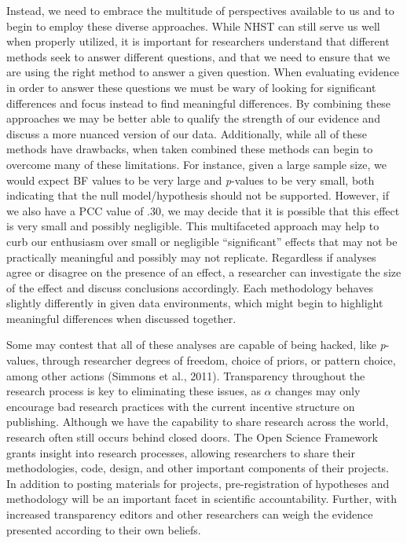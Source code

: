 \documentclass[english,man]{apa6}
\theoremstyle{definition}
\theoremstyle{definition}
\theoremstyle{definition}
\theoremstyle{remark}
\begin{document}
Instead, we need to embrace the multitude of perspectives available to
us and to begin to employ these diverse approaches. While NHST can still
serve us well when properly utilized, it is important for researchers
understand that different methods seek to answer different questions,
and that we need to ensure that we are using the right method to answer
a given question. When evaluating evidence in order to answer these
questions we must be wary of looking for significant differences and
focus instead to find meaningful differences. By combining these
approaches we may be better able to qualify the strength of our evidence
and discuss a more nuanced version of our data. Additionally, while all
of these methods have drawbacks, when taken combined these methods can
begin to overcome many of these limitations. For instance, given a large
sample size, we would expect BF values to be very large and
\emph{p}-values to be very small, both indicating that the null
model/hypothesis should not be supported. However, if we also have a PCC
value of .30, we may decide that it is possible that this effect is very
small and possibly negligible. This multifaceted approach may help to
curb our enthusiasm over small or negligible \enquote{significant}
effects that may not be practically meaningful and possibly may not
replicate. Regardless if analyses agree or disagree on the presence of
an effect, a researcher can investigate the size of the effect and
discuss conclusions accordingly. Each methodology behaves slightly
differently in given data environments, which might begin to highlight
meaningful differences when discussed together.

Some may contest that all of these analyses are capable of being hacked,
like \emph{p}-values, through researcher degrees of freedom, choice of
priors, or pattern choice, among other actions (Simmons et al., 2011).
Transparency throughout the research process is key to eliminating these
issues, as \(\alpha\) changes may only encourage bad research practices
with the current incentive structure on publishing. Although we have the
capability to share research across the world, research often still
occurs behind closed doors. The Open Science Framework grants insight
into research processes, allowing researchers to share their
methodologies, code, design, and other important components of their
projects. In addition to posting materials for projects,
pre-registration of hypotheses and methodology will be an important
facet in scientific accountability. Further, with increased transparency
editors and other researchers can weigh the evidence presented according
to their own beliefs.
\end{document}

